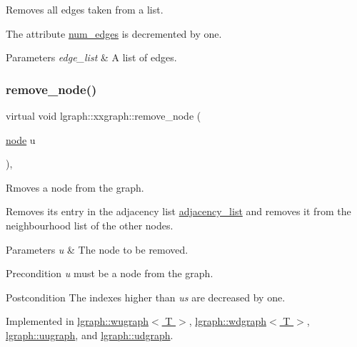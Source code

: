 Removes all edges taken from a list. 

The attribute \hyperlink{classlgraph_1_1xxgraph_a6765a9a3be42f6e0f824635c593b35d7}{num\+\_\+edges} is decremented by one. 
\begin{DoxyParams}{Parameters}
{\em edge\+\_\+list} & A list of edges. \\
\hline
\end{DoxyParams}
\mbox{\label{classlgraph_1_1xxgraph_a5b9e033f38a3ab34734be61aa9344c84}} 
\subsubsection{\texorpdfstring{remove\+\_\+node()}{remove\_node()}}
{\footnotesize\ttfamily virtual void lgraph\+::xxgraph\+::remove\+\_\+node (\begin{DoxyParamCaption}\item[{\hyperlink{namespacelgraph_a397169dd66adf725210a30fb7251773e}{node}}]{u }\end{DoxyParamCaption})\hspace{0.3cm}{\ttfamily [pure virtual]}, {\ttfamily [inherited]}}



Rmoves a node from the graph. 

Removes its entry in the adjacency list \hyperlink{classlgraph_1_1xxgraph_a31cf82d0b20be05290be259dc97a51ec}{adjacency\+\_\+list} and removes it from the neighbourhood list of the other nodes.


\begin{DoxyParams}{Parameters}
{\em u} & The node to be removed. \\
\hline
\end{DoxyParams}
\begin{DoxyPrecond}{Precondition}
{\itshape u} must be a node from the graph. 
\end{DoxyPrecond}
\begin{DoxyPostcond}{Postcondition}
The indexes higher than {\itshape u\textquotesingle{}s} are decreased by one. 
\end{DoxyPostcond}


Implemented in \hyperlink{classlgraph_1_1wugraph_ad8eff47efc751e7bc5aa10b79ff70633}{lgraph\+::wugraph$<$ T $>$}, \hyperlink{classlgraph_1_1wdgraph_aa6861b63fccd1def268f3ff84d31da52}{lgraph\+::wdgraph$<$ T $>$}, \hyperlink{classlgraph_1_1uugraph_aa7f32c48d008edaa4992eb72a176e806}{lgraph\+::uugraph}, and \hyperlink{classlgraph_1_1udgraph_a043aab345008c5eedb4cf429f85e99df}{lgraph\+::udgraph}.

